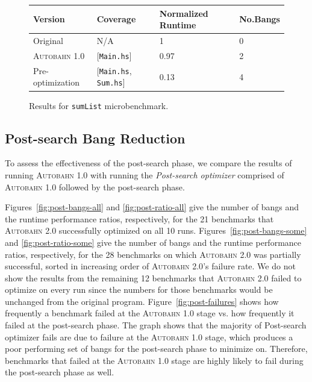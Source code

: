 \documentclass[format=sigplan, review=true, 9pt]{acmart}
\newcommand{\cut}[1]{}
\newcommand{\figref}[1]{Figure~\ref{#1}}
\newcommand{\scaption}[1]{\caption{#1}}
\newcommand{\hotspotcost}[0]{\textit{hotSpotThreshold}}
\newcommand{\Ao}[0]{\textsc{Autobahn 1.0}}
\newcommand{\At}[0]{\textsc{Autobahn 2.0}}
\newcommand{\postopt}[0]{post-search}
\newcommand{\Postopt}[0]{Post-search}
\newcommand{\absim}[0]{\textit{absenceImpact}}
\begin{document}
\begin{figure}
\begin{tabular}{p{2.5cm}p{1.5cm}p{2cm}p{1cm}}
\hline
Version   & Coverage & Normalized Runtime & No.Bangs \\
\hline
Original      & N/A   &   1	 & 0   \\
\Ao{}       & [\texttt{Main.hs}]      & 0.97    &  2\\
Pre-optimization	& [\texttt{Main.hs}, \texttt{Sum.hs}]         & 0.13      & 4\\
\hline
\end{tabular}
\scaption{Results for \texttt{sumList} microbenchmark.}
\label{fig:sumList}
\end{figure}

\subsection{\Postopt{} Bang Reduction}

To assess the effectiveness of the \postopt{} phase,
we compare the results of running \Ao{} with running 
the \textit{\Postopt{} optimizer} comprised of \Ao{} followed by
the \postopt{} phase.
\cut{
Already discussed and so not necessary:
Similarly, we took the mean of running the
program ten times on the NoFib benchmark suite while optimizing on
runtime only, and set both \hotspotcost{} and \absim{} thresholds to
6\%.
A benchmark is successfully optimized if \Ao{} improved its
performance by at least 6\% after optimization. }
Figures~\ref{fig:post-bangs-all} and \ref{fig:post-ratio-all}
give the number of bangs and the runtime performance ratios,
respectively, for the 21 benchmarks that \At{} successfully optimized on all 10 runs. 
Figures~\ref{fig:post-bangs-some} and \ref{fig:post-ratio-some}
give the number of bangs and the runtime performance ratios, respectively,
for the 28 benchmarks on which \At{} was partially successful,
sorted in increasing order of \At{}'s failure rate.
We do not show the results from the remaining 12 benchmarks that \At{}
failed to optimize on every run since the numbers for those benchmarks
would be unchanged from the original program.  \figref{fig:post-failures} shows how
frequently a benchmark failed at the \Ao{} stage vs. how frequently it
failed at the \postopt{} phase. The graph shows that the majority of \Postopt{} optimizer fails are
 due to failure at the \Ao{} stage, which produces a poor performing set of bangs for the \postopt{} phase
 to minimize on. Therefore, benchmarks that failed at the \Ao{} stage are highly likely to fail during 
 the \postopt{} phase as well.
\end{document}
